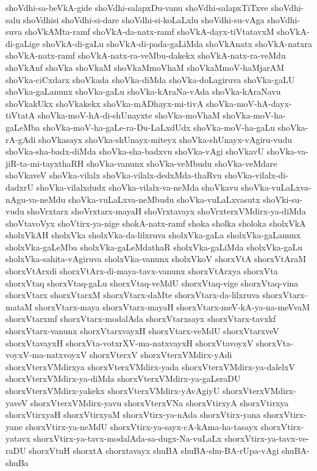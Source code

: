 {shoVdhi-sa-beVkA-gide
shoVdhi-salapxDu-vanu
shoVdhi-salapxTiTxve
shoVdhi-salu
shoVdhisi
shoVdhi-si-dare
shoVdhi-si-koLaLxlu
shoVdhi-su-vAga
shoVdhi-suva
shoVkAMta-ramf
shoVkA-da-natx-ramf
shoVkA-dayx-tiVtatavxM
shoVkA-di-gaLige
shoVkA-di-gaLu
shoVkA-di-pada-gaLiMda
shoVkAnatx
shoVkA-natxra
shoVkA-natx-ramf
shoVkA-natx-ra-veMbu-dakekx
shoVkA-natx-ra-veMdu
shoVkAnf
shoVka
shoVkaM
shoVkaMmoVhaM
shoVkaMmoV-haMjarAM
shoVka-ciCxdarx
shoVkada
shoVka-diMda
shoVka-doLagiruva
shoVka-gaLU
shoVka-gaLanunx
shoVka-gaLu
shoVka-kAraNa-vAda
shoVka-kAraNavu
shoVkakUkx
shoVkakekx
shoVka-mADhayx-mi-tivA
shoVka-moV-hA-dayx-tiVtatA
shoVka-moV-hA-di-shUnayxte
shoVka-moVhaM
shoVka-moV-ha-gaLeMba
shoVka-moV-ha-gaLe-ra-Du-LaLxdUdx
shoVka-moV-ha-gaLu
shoVka-rA-gAdi
shoVkasayx
shoVka-shUnayx-miteyx
shoVka-shUnayx-vAgiru-vudu
shoVka-sha-badx-diMda
shoVka-sha-badxvu
shoVka-vAgi
shoVkavU
shoVka-va-jiR-ta-mi-tayxthaRH
shoVka-vanunx
shoVka-veMbudu
shoVka-veMdare
shoVkaveV
shoVka-vilalx
shoVka-vilalx-dedxMda-thaRvu
shoVka-vilalx-di-dadxrU
shoVka-vilalxdudx
shoVka-vilalx-va-neMda
shoVkavu
shoVka-vuLaLxva-nAgu-va-neMdu
shoVka-vuLaLxva-neMbudu
shoVka-vuLaLxvasutx
shoVki-su-vudu
shoVrxtarx
shoVrxtarx-mayaH
shoVrxtavayx
shoVrxterxVMdirx-ya-diMda
shoVtavoVyx
shoVtirx-ya-nige
shokA-natx-ramf
shoka
sholka
sholoka
sholxVkA
sholxVkAH
sholxVka
sholxVka-da-lilxruva
sholxVka-gaLa
sholxVka-gaLanunx
sholxVka-gaLeMba
sholxVka-gaLeMdathaR
sholxVka-gaLiMda
sholxVka-gaLu
sholxVka-sahita-vAgiruva
sholxVka-vanunx
sholxVkoV
shorxVtA
shorxVtAraM
shorxVtArxdi
shorxVtArx-di-maya-tavx-vanunx
shorxVtArxya
shorxVta
shorxVtaq
shorxVtaq-gaLu
shorxVtaq-veMdU
shorxVtaq-vige
shorxVtaq-vina
shorxVtarx
shorxVtarxM
shorxVtarx-daMte
shorxVtarx-da-lilxruva
shorxVtarx-mataM
shorxVtarx-maya
shorxVtarx-mayaH
shorxVtarx-meV-kA-ya-na-meVvaM
shorxVtarxmf
shorxVtarx-modalAda
shorxVtarxsayx
shorxVtarx-tavxkf
shorxVtarx-vanunx
shorxVtarxvayxH
shorxVtarx-veMdU
shorxVtarxveV
shorxVtavayxH
shorxVta-votxrXV-ma-natxvayxH
shorxVtavoyxV
shorxVta-voyxV-ma-natxvoyxV
shorxVterxV
shorxVterxVMdirx-yAdi
shorxVterxVMdirxya
shorxVterxVMdirx-yada
shorxVterxVMdirx-ya-dalelxV
shorxVterxVMdirx-ya-diMda
shorxVterxVMdirx-ya-gaLeraDU
shorxVterxVMdirx-yakekx
shorxVterxVMdirx-yAvAgiyU
shorxVterxVMdirx-yaveV
shorxVterxVMdirx-yavu
shorxVterxVNa
shorxVtirxyA
shorxVtirxya
shorxVtirxyaH
shorxVtirxyaM
shorxVtirx-ya-nAda
shorxVtirx-yana
shorxVtirx-yane
shorxVtirx-ya-neMdU
shorxVtirx-ya-sayx-cA-kAma-ha-tasayx
shorxVtirx-yatavx
shorxVtirx-ya-tavx-modalAda-sa-dugx-Na-vuLaLx
shorxVtirx-ya-tavx-ve-raDU
shorxVtuH
shorxtA
shorxtavayx
shuBA
shuBA-shu-BA-rUpa-vAgi
shuBA-shuBa
}
